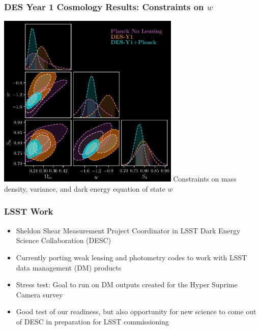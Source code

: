 \documentclass{beamer}
\begin{document}
\frame
{
    \frametitle{DES Year 1 Cosmology Results: Constraints on $w$}


    \begin{center}
        \includegraphics[width=0.65\textwidth]{dpnl_w_inv.png}
        \newline
        Constraints on mass density, variance, and dark energy equation of state $w$
    \end{center}

}

\frame
{
    \frametitle{LSST Work}


    \begin{itemize}

         \item Sheldon {\color{gold} Shear Measurement Project Coordinator} in LSST Dark Energy Science Collaboration (DESC)

         \item Currently porting weak lensing and photometry codes to work with LSST data management (DM) products

         \item Stress test:  Goal to run on DM outputs created for the Hyper Suprime Camera survey

         \item Good test of our readiness, but also opportunity for new science
             to come out of DESC in preparation for LSST commissioning

    \end{itemize}



}
\end{document}
